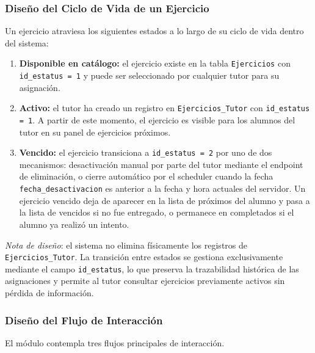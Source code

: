\subsubsection{Diseño del Ciclo de Vida de un Ejercicio}

Un ejercicio atraviesa los siguientes estados a lo largo de su ciclo de
vida dentro del sistema:

\begin{enumerate}
    \item \textbf{Disponible en catálogo:} el ejercicio existe en la tabla
    \texttt{Ejercicios} con \texttt{id\_estatus = 1} y puede ser
    seleccionado por cualquier tutor para su asignación.

    \item \textbf{Activo:} el tutor ha creado un registro en
    \texttt{Ejercicios\_Tutor} con \texttt{id\_estatus = 1}. A partir de
    este momento, el ejercicio es visible para los alumnos del tutor en
    su panel de ejercicios próximos.

    \item \textbf{Vencido:} el ejercicio transiciona a
    \texttt{id\_estatus = 2} por uno de dos mecanismos: desactivación
    manual por parte del tutor mediante el endpoint de eliminación, o
    cierre automático por el scheduler cuando la fecha
    \texttt{fecha\_desactivacion} es anterior a la fecha y hora actuales
    del servidor. Un ejercicio vencido deja de aparecer en la lista de
    próximos del alumno y pasa a la lista de vencidos si no fue entregado,
    o permanece en completados si el alumno ya realizó un intento.
\end{enumerate}

\noindent \textit{Nota de diseño}: el sistema no elimina físicamente los
registros de \texttt{Ejercicios\_Tutor}. La transición entre estados se
gestiona exclusivamente mediante el campo \texttt{id\_estatus}, lo que
preserva la trazabilidad histórica de las asignaciones y permite al tutor
consultar ejercicios previamente activos sin pérdida de información.

\subsubsection{Diseño del Flujo de Interacción}

El módulo contempla tres flujos principales de interacción.

